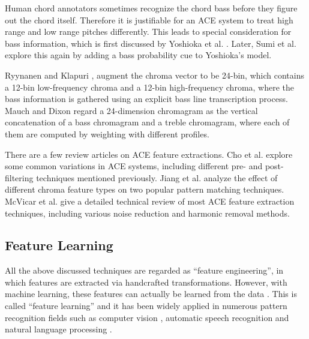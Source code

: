 Human chord annotators sometimes recognize the chord bass before they figure out the chord itself. Therefore it is justifiable for an ACE system to treat high range and low range pitches differently. This leads to special consideration for bass information, which is first discussed by Yoshioka et al. \cite{yoshioka2004automatic}. Later, Sumi et al. \cite{sumi2008automatic} explore this again by adding a bass probability cue to Yoshioka's model.

Ryynanen and Klapuri \cite{ryynanen2008automatic}, augment the chroma vector to be 24-bin, which contains a 12-bin low-frequency chroma and a 12-bin high-frequency chroma, where the bass information is gathered using an explicit bass line transcription process. Mauch and Dixon \cite{mauch2010approximate,mauch2010simultaneous} regard a 24-dimension chromagram as the vertical concatenation of a bass chromagram and a treble chromagram, where each of them are computed by weighting with different profiles.

There are a few review articles on ACE feature extractions. Cho et al. \cite{cho2010exploring} explore some common variations in ACE systems, including different pre- and post-filtering techniques mentioned previously. Jiang et al. \cite{jiang2011analyzing} analyze the effect of different chroma feature types on two popular pattern matching techniques. McVicar et al. \cite{mcvicar2014automatic} give a detailed technical review of most ACE feature extraction techniques, including various noise reduction and harmonic removal methods.


\subsection{Feature Learning} \label{sec:2-fl}
All the above discussed techniques are regarded as ``feature engineering'', in which features are extracted via handcrafted transformations. However, with machine learning, these features can actually be learned from the data \cite{bengio2009learning}. This is called ``feature learning'' and it has been widely applied in numerous pattern recognition fields such as computer vision \cite{hinton2006reducing}, automatic speech recognition and natural language processing \cite{deng2014deep}.

